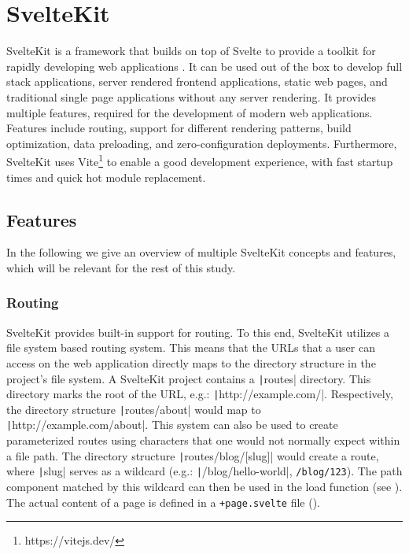 \section{SvelteKit}
\label{sec:sveltekit}

SvelteKit is a framework that builds on top of Svelte to provide a toolkit for rapidly developing web applications \cite{noauthor_sveltekit_nodate}. It can be used out of the box to develop full stack applications, server rendered frontend applications, static web pages, and traditional single page applications without any server rendering. It provides multiple features, required for the development of modern web applications. Features include routing, support for different rendering patterns, build optimization, data preloading, and zero-configuration deployments. Furthermore, SvelteKit uses Vite\footnote{https://vitejs.dev/} to enable a good development experience, with fast startup times and quick hot module replacement.


\subsection{Features}
In the following we give an overview of multiple SvelteKit concepts and features, which will be relevant for the rest of this study.


\subsubsection{Routing}
\label{sec:sveltekit-routing}

SvelteKit provides built-in support for routing. To this end, SvelteKit utilizes a file system based routing system. This means that the URLs that a user can access on the web application directly maps to the directory structure in the project's file system. A SvelteKit project contains a \texttt|routes| directory. This directory marks the root of the URL, e.g.: \texttt|http://example.com/|. Respectively, the directory structure \texttt|routes/about| would map to \texttt|http://example.com/about|. This system can also be used to create parameterized routes using characters that one would not normally expect within a file path. The directory structure \texttt|routes/blog/[slug]| would create a route, where \texttt|slug| serves as a wildcard (e.g.: \texttt|/blog/hello-world|, \texttt{/blog/123}). The path component matched by this wildcard can then be used in the load function (see ). The actual content of a page is defined in a \texttt{+page.svelte} file ().

